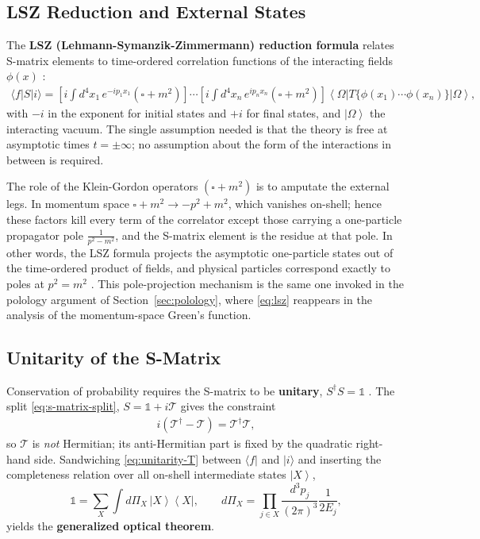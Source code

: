 \subsection{LSZ Reduction and External States}
\label{subsec:lsz-reduction-and-external-states}

The \textbf{LSZ (Lehmann-Symanzik-Zimmermann) reduction formula} relates S-matrix elements to time-ordered correlation functions of the interacting fields $\phi(x)$ \autocite[Chapter~6]{schwartzQFT2014}:
\begin{align}
    \label{eq:lsz}
    \langle f | S | i \rangle =
    \left[ i \int d^4 x_1\, e^{-i p_1 x_1} (\square + m^2) \right]
    \cdots
    \left[ i \int d^4 x_n\, e^{i p_n x_n} (\square + m^2) \right]
    \left\langle \Omega \right| T\{\phi(x_1) \cdots \phi(x_n)\} \left| \Omega \right\rangle,
\end{align}
with $-i$ in the exponent for initial states and $+i$ for final states, and $\left| \Omega \right\rangle$ the interacting vacuum. The single assumption needed is that the theory is free at asymptotic times $t = \pm\infty$; no assumption about the form of the interactions in between is required.

The role of the Klein-Gordon operators $(\square + m^2)$ is to amputate the external legs. In momentum space $\square + m^2 \to -p^2 + m^2$, which vanishes on-shell; hence these factors kill every term of the correlator except those carrying a one-particle propagator pole $\frac{1}{p^2 - m^2}$, and the S-matrix element is the residue at that pole. In other words, the LSZ formula projects the asymptotic one-particle states out of the time-ordered product of fields, and physical particles correspond exactly to poles at $p^2 = m^2$ \autocite[(6.1), \S6.1.1]{schwartzQFT2014}. This pole-projection mechanism is the same one invoked in the polology argument of Section~\ref{sec:polology}, where \eqref{eq:lsz} reappears in the analysis of the momentum-space Green's function.

\subsection{Unitarity of the S-Matrix}
\label{subsec:unitarity-of-the-s-matrix}

Conservation of probability requires the S-matrix to be \textbf{unitary}, $S^\dagger S = \mathbb{1}$ \autocite[(24.5)]{schwartzQFT2014}. The split \eqref{eq:s-matrix-split}, $S = \mathbb{1} + i\mathcal{T}$ gives the constraint
\begin{align}
    \label{eq:unitarity-T}
    i\left( \mathcal{T}^\dagger - \mathcal{T} \right) = \mathcal{T}^\dagger \mathcal{T},
\end{align}
so $\mathcal{T}$ is \emph{not} Hermitian; its anti-Hermitian part is fixed by the quadratic right-hand side. Sandwiching \eqref{eq:unitarity-T} between $\langle f|$ and $|i\rangle$ and inserting the completeness relation over all on-shell intermediate states $\left| X \right\rangle$,
\[
    \mathbb{1} = \sum_X \int d\Pi_X\, \left| X \right\rangle \left\langle X \right|,
    \qquad
    d\Pi_X = \prod_{j \in X} \frac{d^3 p_j}{(2\pi)^3}\frac{1}{2E_j},
\]
yields the \textbf{generalized optical theorem}.

